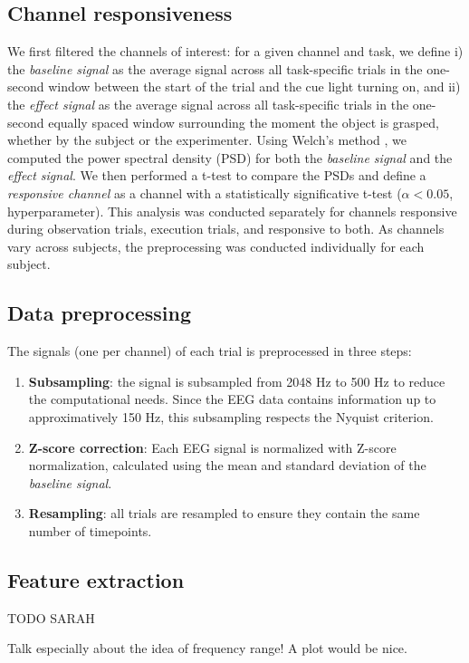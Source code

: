 \documentclass[10pt,conference,compsocconf]{IEEEtran}
\begin{document}
\subsection{Channel responsiveness}
We first filtered the channels of interest: for a given channel and task, we define i) the \textit{baseline signal} as the average signal across all task-specific trials in the one-second window between the start of the trial and the cue light turning on, and ii) the \textit{effect signal} as the average signal across all task-specific trials in the one-second equally spaced window surrounding the moment the object is grasped, whether by the subject or the experimenter. Using Welch's method \cite{welch}, we computed the power spectral density (PSD) for both the \textit{baseline signal} and the \textit{effect signal}. We then performed a t-test to compare the PSDs and define a \textit{responsive channel} as a channel with a statistically significative t-test (\(\alpha<0.05\), hyperparameter). This analysis was conducted separately for channels responsive during observation trials, execution trials, and responsive to both. As channels vary across subjects, the preprocessing was conducted individually for each subject.

\subsection{Data preprocessing}
\label{subsec:preproc}
The signals (one per channel) of each trial is preprocessed in three steps:
\begin{enumerate}
  \item \textbf{Subsampling}: the signal is subsampled from 2048 Hz to 500 Hz to reduce the computational needs. Since the EEG data contains information up to approximatively 150 Hz, this subsampling respects the Nyquist criterion.
  \item \textbf{Z-score correction}: Each EEG signal is normalized with Z-score normalization, calculated using the mean and standard deviation of the \textit{baseline signal}.
  \item \textbf{Resampling}: all trials are resampled to ensure they contain the same number of timepoints.
\end{enumerate}

\subsection{Feature extraction}
TODO SARAH

Talk especially about the idea of frequency range! A plot would be nice.
\end{document}
